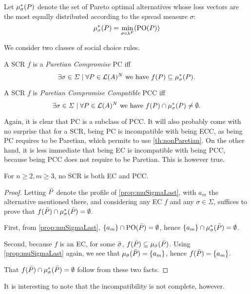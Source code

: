 \documentclass[version=3.21, pagesize, twoside=off, bibliography=totoc, DIV=calc, fontsize=12pt, a4paper]{scrartcl}
\begin{document}
Let $\mu_{\sigma}^*(P)$ denote the set of Pareto optimal alternatives whose loss vectors are the most equally distributed according to the spread measure $\sigma$:
\[\mu_{\sigma}^*(P) = \min_{\sigma \circ \lambda^P} (\text{PO}(P))\]

We consider two classes of social choice rules.

\begin{definition} A SCR $f$ is a \emph{Paretian Compromise} PC iff \[\exists \sigma \in \Sigma \suchthat \forall P \in \linors^N \text{ we have } f(P) \subseteq \mustar(P).\]
\end{definition}

\begin{definition} A SCR $f$ is \emph{Paretian Compromise Compatible} PCC iff \[\exists \sigma \in \Sigma \suchthat \forall P \in \linors^N \text{ we have } f(P) \cap \mustar(P) \neq \emptyset.\]
\end{definition}

Again, it is clear that PC is a subclass of PCC. It will also probably come with no surprise that for a SCR, being PC is incompatible with being ECC, as being PC requires to be Paretian, which permits to use \cref{th:nonParetian}. On the other hand, it is less immediate that being EC is incompatible with
being PCC, because being PCC does not require to be Paretian. This is however true.

\begin{theorem} \label{th:incompatibility} 
	For $n ≥ 2, m ≥ 3$, no SCR is both EC and PCC.
\end{theorem}
\begin{proof}	
	Letting $\bar{P}$ denote the profile of \cref{prop:muSigmaLast}, with $a_m$ the alternative mentioned there, and considering any EC $f$ and any $\sigma \in \Sigma$, suffices to prove that $f(\bar{P}) \cap \mu_{\sigma}^*(\bar{P}) = \emptyset$.
	
	First, from \cref{prop:muSigmaLast}, $\{a_m\} \cap \text{PO}(\bar{P}) = \emptyset$, hence $\{a_m\} \cap \mu_{\sigma}^*(\bar{P}) = \emptyset$.
	
	Second, because $f$ is an EC, for some $\bar{\sigma}$, $f(\bar{P}) \subseteq \mu_{\bar{\sigma}}(\bar{P})$. Using \cref{prop:muSigmaLast} again, we see that $\mu_{\bar{\sigma}}(\bar{P}) = \{a_m\}$, hence $f(\bar{P}) = \{a_m\}$.
	
	That $f(\bar{P}) \cap \mu_{\sigma}^*(\bar{P}) = \emptyset$ follow from these two facts.
\end{proof}

It is interesting to note that the incompatibility is not complete, however.
\end{document}
